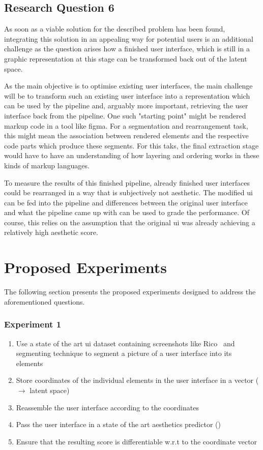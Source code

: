 \documentclass[10pt,a4paper]{scrartcl} %
\begin{document}
\subsection{Research Question 6}
As soon as a viable solution for the described problem has been found, integrating this solution in an appealing way for potential users is an additional challenge as the question arises how a finished user interface, which is still in a graphic representation at this stage can be transformed back out of the latent space.

As the main objective is to optimise existing user interfaces, the main challenge will be to transform such an existing user interface into a representation which can be used by the pipeline and, arguably more important, retrieving the user interface back from the pipeline. One such "starting point" might be rendered markup code in a tool like figma. For a segmentation and rearrangement task, this might mean the association between rendered elements and the respective code parts which produce these segments. For this taks, the final extraction stage would have to have an understanding of how layering and ordering works in these kinds of markup languages.

To measure the results of this finished pipeline, already finished user interfaces could be rearranged in a way that is subjectively not aesthetic. The modified \ac{ui} can be fed into the pipeline and differences between the original user interface and what the pipeline came up with can be used to grade the performance. Of course, this relies on the assumption that the original \ac{ui} was already achieving a relatively high aesthetic score.

\section{Proposed Experiments}
The following section presents the proposed experiments designed to address the aforementioned questions. 
\subsubsection{Experiment 1}
\begin{enumerate}
    \item Use a state of the art \ac{ui} dataset containing screenshots like Rico~\cite{10.1145/3126594.3126651} and segmenting technique to segment a picture of a user interface into its elements
    \item Store coordinates of the individual elements in the user interface in a vector ($\to$ latent space)
    \item Reassemble the user interface according to the coordinates
    \item Pass the user interface in a state of the art aesthetics predictor (\cite{Leiva2023})
    \item Ensure that the resulting score is differentiable w.r.t to the coordinate vector
\end{enumerate}
\end{document}
